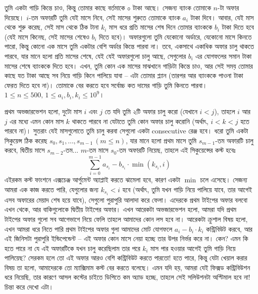 \begin{exercise}
তুমি একটা গাড়ি কিন্তে চাও, কিন্তু তোমার কাছে বর্তমাকে ০ টাকা আছে। সেজন্য ব্যাংক তোমাকে $n$-টা অফার দিয়েছে। $i$-তম অফারটি তুমি যেই মাসে নিবে, সেই মাসের শুরুতে তোমাকে ব্যাংক $a_i$ টাকা দিবে। আবার, যেই মাস থেকে শুরু করেছ, সেই মাস থেকে ঠিক টানা $k_i$ মাস ধরে প্রতি মাসের শেষ দিনে তোমার ব্যাংককে $b_i$ টাকা দিতে হবে (যেই মাসে কিনেছ, সেই মাসের শেষেও $b_i$ দিতে হবে)। অফারগুলো তুমি যেকোনো অর্ডারে, যেকোনো মাসে কিনতে পারো, কিন্তু কোনো এক মাসে তুমি একটার বেশি অর্ডার কিন্তে পারবা না। তবে, একসাথে একাধিক অফার চালু থাকতে পারবে, যার মানে হলো প্রতি মাসের শেষে, যেই যেই অফারগুলো চালু আছে, সেগুলোর $b_i$ এর যোগফলের সমান টাকা মাসের শেষে ব্যাংককে দিতে হবে। এখন, তুমি কোন এক মাসের মাঝখানে গাড়িটা কিন্তে চাও, আর সেই সময় তোমার কাছে যত টাকা আছে সব নিয়ে গাড়ি কিনে পালিয়ে যাবা -- এটা তোমার প্ল্যান (তারপর আর ব্যাংককে পাওনা টাকা ফেরত দিতে হবে না)। তোমাকে বের করতে হবে সর্বোচ্চ কত দামের গাড়ি তুমি কিনতে পারবা।	 $1 \le n \le 500, \, 1 \le a_i, b_i, k_i \le 10^9$।
\begin{hint}
প্রথম অভজারভেশন হলো, দুটো মাস $i$ এবং $j$ তে যদি তুমি ২টি অফার চালু করো (যেখানে $i < j$), তাহলে $i$ আর $j$ এর মধ্যে এমন কোন মাস $k$ থাকতে পারবে না যেটাতে তুমি কোন অফার চালু করোনি (অর্থাৎ, $i < k < j$ হতে পারবে না)। সুতরাং যেই মাসগুলোতে তুমি চালু করবা সেগুলো একটা consecutive রেঞ্জ হবে। ধরো তুমি একটা সিকুয়েন্স ঠিক করেছ $s_0, s_1, \ldots, s_{m-1} \, (m \le n)$, যার মানে হলো প্রথম মাসে তুমি $s_{m-1}$-তম অফারটি চালু করবে, দ্বিতীয় মাসে $s_{m-2}$-তম... $m$-তম মাসে $s_0$-তম অফারটি নিয়েছ, তাহলে এই সিকুয়েন্সের কস্ট হবেঃ
\[
  \sum_{i=0}^{m-1} a_{s_i} - b_{s_i} \cdot \min(k_{s_i}, i)
\]
এইরকম কস্ট ফাংশনে এক্সচেঞ্জ আর্গুমেন্ট অ্যাপ্লাই করতে ঝামেলা হবে, কারণ একটা $\min$ চলে এসেছে। সেজন্য আমরা এক কাজ করতে পারি, যেগুলোর জন্য $k_{s_i} < i$ হবে (অর্থাৎ, তুমি যখন গাড়ি নিয়ে পালিয়ে যাবে, তার আগেই এসব অফারের মেয়াদ শেষ হয়ে যাবে), সেগুলো পুরাপুরি আলাদা করে ফেলা। এদেরকে প্রথম টাইপের অফার বলবো এখন থেকে, আর বাকিগুলোকে দ্বিতীয় টাইপের অফার। এখন আরেকটা অভজারভেশন হলো, আমরা যদি প্রথম টাইপের অফার গুলো সব আগেভাগে নিয়ে ফেলি তাহলে আমাদের কোন লস হবে না। আরেকটা ক্রুশাল বিষয় হলো, এখন আমরা ধরে নিতে পারি প্রথম টাইপের অফার গুলা আমাদের মোট যোগফলে $a_i - b_i \cdot k_i$ কন্ট্রিবিউট করবে, আর এই জিনিসটা পুরাপুরি ইন্ডিপেন্ডেন্ট -- এই অফার কোন মাসে নেয়া হচ্ছে তার উপর নির্ভর করে না। কেন? এমন কি হতে পারে না যে এই অফারটিকে যখন চালু করেছিলাম তার পরে $k_i$ মাস পার হওয়ার আগেই তুমি গাড়ি নিয়ে পালিয়েছ? সেরকম হলে তো এই অফার আরও বেশি কন্ট্রিবিউট করতে পারতো! হতে পারে, কিন্তু যেটা খেয়াল করার বিষয় তা হলো, আমাদেরকে তো ম্যাক্সিমাম কস্ট বের করতে বলেছে। এমন যদি হয়, আমরা যেই ফিক্সড কন্ট্রিবিউশন ধরে নিয়েছি, তার কারণে আসল কস্টের চাইতে ডিপিতে কম অ্যাড হচ্ছে, তাহলে সেই সলিউশনটা অপ্টিমাল হবে না! চিন্তা করে দেখো এটা।


\end{hint}
\end{exercise}
